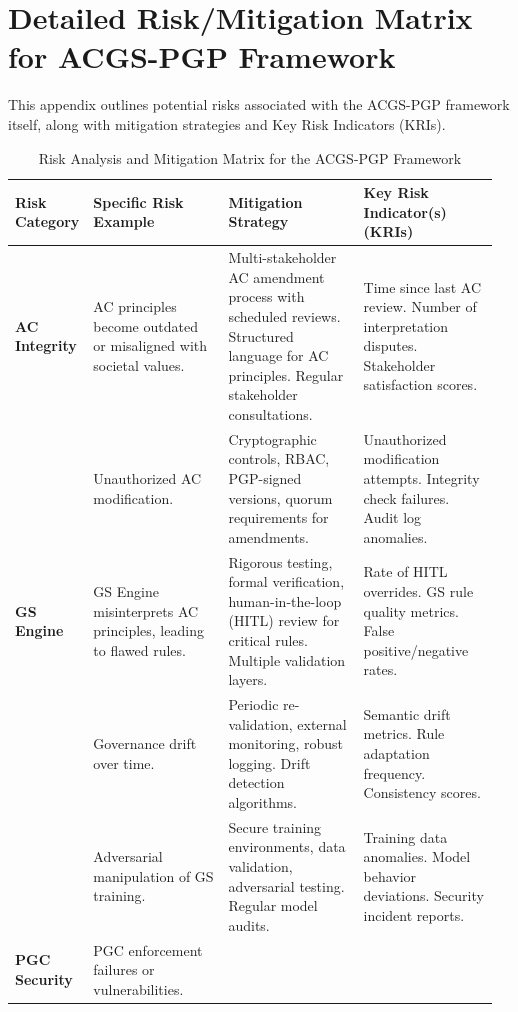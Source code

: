 \documentclass[sigconf,review,anonymous=false]{acmart} %
\begin{document}
\section{Detailed Risk/Mitigation Matrix for ACGS-PGP Framework}
\label{app:risk_matrix}
This appendix outlines potential risks associated with the ACGS-PGP framework itself, along with mitigation strategies and Key Risk Indicators (KRIs).

\begin{table}[!ht]
  \caption{Risk Analysis and Mitigation Matrix for the ACGS-PGP Framework}
  \label{tab:risk_mitigation_matrix}
  {\scriptsize
  \begin{tabular}{@{}p{0.11\linewidth}p{0.28\linewidth}p{0.28\linewidth}p{0.29\linewidth}@{}}
    \toprule
    \textbf{Risk Category} & \textbf{Specific Risk Example} & \textbf{Mitigation Strategy} & \textbf{Key Risk Indicator(s) (KRIs)} \\
    \midrule
    \textbf{AC Integrity} &
    AC principles become outdated or misaligned with societal values. &
    Multi-stakeholder AC amendment process with scheduled reviews. Structured language for AC principles. Regular stakeholder consultations. &
    Time since last AC review. Number of interpretation disputes. Stakeholder satisfaction scores. \\
    \addlinespace
    & Unauthorized AC modification. &
    Cryptographic controls, RBAC, PGP-signed versions, quorum requirements for amendments. &
    Unauthorized modification attempts. Integrity check failures. Audit log anomalies. \\
    \midrule
    \textbf{GS Engine} &
    GS Engine misinterprets AC principles, leading to flawed rules. &
    Rigorous testing, formal verification, human-in-the-loop (HITL) review for critical rules. Multiple validation layers. &
    Rate of HITL overrides. GS rule quality metrics. False positive/negative rates. \\
    \addlinespace
    & Governance drift over time. &
    Periodic re-validation, external monitoring, robust logging. Drift detection algorithms. &
    Semantic drift metrics. Rule adaptation frequency. Consistency scores. \\
    \addlinespace
    & Adversarial manipulation of GS training. &
    Secure training environments, data validation, adversarial testing. Regular model audits. &
    Training data anomalies. Model behavior deviations. Security incident reports. \\
    \midrule
    \textbf{PGC Security} &
    PGC enforcement failures or vulnerabilities. &

\end{tabular}}
\end{table}
\end{document}
